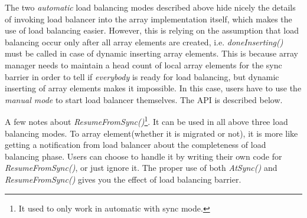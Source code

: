 The two {\em automatic} load balancing modes described above hide nicely
the details of invoking load balancer into the array implementation itself,
which makes the use of load balancing easier. 
However, this is relying on the assumption that load balancing occur only
after all array elements are created, i.e. {\em doneInserting()} 
must be called in case of dynamic inserting array elements. 
This is because array manager needs to maintain a head count of 
local array elements for the sync barrier
in order to tell if {\it everybody} is ready for load balancing, but
 dynamic inserting of array elements makes it impossible. In this case,
users have to use the {\em manual mode} to start load balancer themselves.
The API is described below.

A few notes about {\em ResumeFromSync()}\footnote{It used to 
only work in automatic with sync mode.}. It can be used in all above three
load balancing modes. To array element(whether it is migrated or not), 
it is more like getting a notification from load
balancer about the completeness of load balancing phase.
Users can choose to handle it by writing their own
code for {\em ResumeFromSync()}, or just ignore it. The proper use of both 
{\em AtSync()} and {\em ResumeFromSync()} gives you the effect of 
load balancing barrier. 

